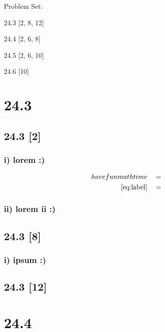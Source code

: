 \documentclass{article}
\begin{document}
{\large \noindent Problem Set:}

\par 24.3 [2, 8, 12]
\par 24.4 [2, 6, 8]
\par 24.5 [2, 6, 10]
\par 24.6 [10]
\vspace{5mm}

\noindent \hrulefill

\section*{24.3}
\setcounter{equation}{0}

\subsection*{24.3 [2]}

\subsubsection*{i) lorem :)}

\begin{align}
    \label{eq:label}
    have fun math time && &=
    \\
    \label{eq:label2}
    \eqref{eq:label} && &=
\end{align}
\subsubsection*{ii) lorem ii :)}

\subsection*{24.3 [8]}

\subsubsection*{i) ipsum :)}

\subsection*{24.3 [12]}

\newpage

\section*{24.4}
\setcounter{equation}{0}
\end{document}
